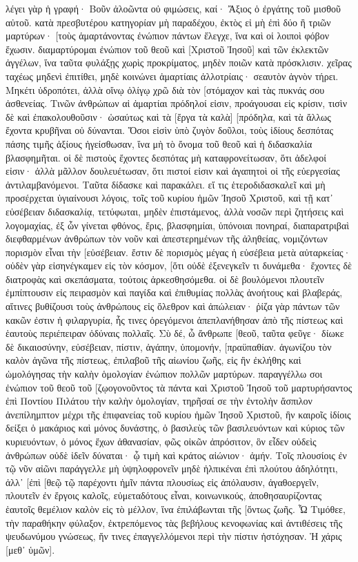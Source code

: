 λέγει γὰρ ἡ γραφή· Βοῦν ἀλοῶντα οὐ φιμώσεις, καί· Ἄξιος ὁ ἐργάτης τοῦ μισθοῦ αὐτοῦ. 
κατὰ πρεσβυτέρου κατηγορίαν μὴ παραδέχου, ἐκτὸς εἰ μὴ ἐπὶ δύο ἢ τριῶν μαρτύρων· 
[τοὺς ἁμαρτάνοντας ἐνώπιον πάντων ἔλεγχε, ἵνα καὶ οἱ λοιποὶ φόβον ἔχωσιν. 
διαμαρτύρομαι ἐνώπιον τοῦ θεοῦ καὶ [Χριστοῦ Ἰησοῦ] καὶ τῶν ἐκλεκτῶν ἀγγέλων, ἵνα ταῦτα φυλάξῃς χωρὶς προκρίματος, μηδὲν ποιῶν κατὰ πρόσκλισιν. 
χεῖρας ταχέως μηδενὶ ἐπιτίθει, μηδὲ κοινώνει ἁμαρτίαις ἀλλοτρίαις· σεαυτὸν ἁγνὸν τήρει. 
Μηκέτι ὑδροπότει, ἀλλὰ οἴνῳ ὀλίγῳ χρῶ διὰ τὸν [στόμαχον καὶ τὰς πυκνάς σου ἀσθενείας. 
Τινῶν ἀνθρώπων αἱ ἁμαρτίαι πρόδηλοί εἰσιν, προάγουσαι εἰς κρίσιν, τισὶν δὲ καὶ ἐπακολουθοῦσιν· 
ὡσαύτως καὶ τὰ [ἔργα τὰ καλὰ] [πρόδηλα, καὶ τὰ ἄλλως ἔχοντα κρυβῆναι οὐ δύνανται. 
Ὅσοι εἰσὶν ὑπὸ ζυγὸν δοῦλοι, τοὺς ἰδίους δεσπότας πάσης τιμῆς ἀξίους ἡγείσθωσαν, ἵνα μὴ τὸ ὄνομα τοῦ θεοῦ καὶ ἡ διδασκαλία βλασφημῆται. 
οἱ δὲ πιστοὺς ἔχοντες δεσπότας μὴ καταφρονείτωσαν, ὅτι ἀδελφοί εἰσιν· ἀλλὰ μᾶλλον δουλευέτωσαν, ὅτι πιστοί εἰσιν καὶ ἀγαπητοὶ οἱ τῆς εὐεργεσίας ἀντιλαμβανόμενοι. Ταῦτα δίδασκε καὶ παρακάλει. 
εἴ τις ἑτεροδιδασκαλεῖ καὶ μὴ προσέρχεται ὑγιαίνουσι λόγοις, τοῖς τοῦ κυρίου ἡμῶν Ἰησοῦ Χριστοῦ, καὶ τῇ κατ᾽ εὐσέβειαν διδασκαλίᾳ, 
τετύφωται, μηδὲν ἐπιστάμενος, ἀλλὰ νοσῶν περὶ ζητήσεις καὶ λογομαχίας, ἐξ ὧν γίνεται φθόνος, ἔρις, βλασφημίαι, ὑπόνοιαι πονηραί, 
διαπαρατριβαὶ διεφθαρμένων ἀνθρώπων τὸν νοῦν καὶ ἀπεστερημένων τῆς ἀληθείας, νομιζόντων πορισμὸν εἶναι τὴν [εὐσέβειαν. 
ἔστιν δὲ πορισμὸς μέγας ἡ εὐσέβεια μετὰ αὐταρκείας· 
οὐδὲν γὰρ εἰσηνέγκαμεν εἰς τὸν κόσμον, [ὅτι οὐδὲ ἐξενεγκεῖν τι δυνάμεθα· 
ἔχοντες δὲ διατροφὰς καὶ σκεπάσματα, τούτοις ἀρκεσθησόμεθα. 
οἱ δὲ βουλόμενοι πλουτεῖν ἐμπίπτουσιν εἰς πειρασμὸν καὶ παγίδα καὶ ἐπιθυμίας πολλὰς ἀνοήτους καὶ βλαβεράς, αἵτινες βυθίζουσι τοὺς ἀνθρώπους εἰς ὄλεθρον καὶ ἀπώλειαν· 
ῥίζα γὰρ πάντων τῶν κακῶν ἐστιν ἡ φιλαργυρία, ἧς τινες ὀρεγόμενοι ἀπεπλανήθησαν ἀπὸ τῆς πίστεως καὶ ἑαυτοὺς περιέπειραν ὀδύναις πολλαῖς. 
Σὺ δέ, ὦ ἄνθρωπε [θεοῦ, ταῦτα φεῦγε· δίωκε δὲ δικαιοσύνην, εὐσέβειαν, πίστιν, ἀγάπην, ὑπομονήν, [πραϋπαθίαν. 
ἀγωνίζου τὸν καλὸν ἀγῶνα τῆς πίστεως, ἐπιλαβοῦ τῆς αἰωνίου ζωῆς, εἰς ἣν ἐκλήθης καὶ ὡμολόγησας τὴν καλὴν ὁμολογίαν ἐνώπιον πολλῶν μαρτύρων. 
παραγγέλλω σοι ἐνώπιον τοῦ θεοῦ τοῦ [ζῳογονοῦντος τὰ πάντα καὶ Χριστοῦ Ἰησοῦ τοῦ μαρτυρήσαντος ἐπὶ Ποντίου Πιλάτου τὴν καλὴν ὁμολογίαν, 
τηρῆσαί σε τὴν ἐντολὴν ἄσπιλον ἀνεπίλημπτον μέχρι τῆς ἐπιφανείας τοῦ κυρίου ἡμῶν Ἰησοῦ Χριστοῦ, 
ἣν καιροῖς ἰδίοις δείξει ὁ μακάριος καὶ μόνος δυνάστης, ὁ βασιλεὺς τῶν βασιλευόντων καὶ κύριος τῶν κυριευόντων, 
ὁ μόνος ἔχων ἀθανασίαν, φῶς οἰκῶν ἀπρόσιτον, ὃν εἶδεν οὐδεὶς ἀνθρώπων οὐδὲ ἰδεῖν δύναται· ᾧ τιμὴ καὶ κράτος αἰώνιον· ἀμήν. 
Τοῖς πλουσίοις ἐν τῷ νῦν αἰῶνι παράγγελλε μὴ ὑψηλοφρονεῖν μηδὲ ἠλπικέναι ἐπὶ πλούτου ἀδηλότητι, ἀλλ᾽ [ἐπὶ [θεῷ τῷ παρέχοντι ἡμῖν πάντα πλουσίως εἰς ἀπόλαυσιν, 
ἀγαθοεργεῖν, πλουτεῖν ἐν ἔργοις καλοῖς, εὐμεταδότους εἶναι, κοινωνικούς, 
ἀποθησαυρίζοντας ἑαυτοῖς θεμέλιον καλὸν εἰς τὸ μέλλον, ἵνα ἐπιλάβωνται τῆς [ὄντως ζωῆς. 
Ὦ Τιμόθεε, τὴν παραθήκην φύλαξον, ἐκτρεπόμενος τὰς βεβήλους κενοφωνίας καὶ ἀντιθέσεις τῆς ψευδωνύμου γνώσεως, 
ἥν τινες ἐπαγγελλόμενοι περὶ τὴν πίστιν ἠστόχησαν. Ἡ χάρις [μεθ᾽ ὑμῶν]. 
